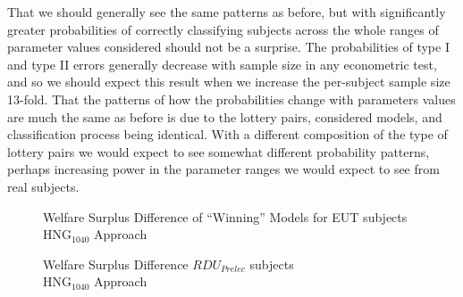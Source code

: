 \documentclass[../main.tex]{subfiles}
\begin{document}
That we should generally see the same patterns as before, but with significantly greater probabilities of correctly classifying subjects across the whole ranges of parameter values considered should not be a surprise.
The probabilities of type I and type II errors generally decrease with sample size in any econometric test, and so we should expect this result when we increase the per-subject sample size 13-fold.
That the patterns of how the probabilities change with parameters values are much the same as before is due to the lottery pairs, considered models, and classification process being identical.
With a different composition of the type of lottery pairs we would expect to see somewhat different probability patterns, perhaps increasing power in the parameter ranges we would expect to see from real subjects.

\begin{figure}[h!]
	\center
	\caption{Welfare Surplus Difference of \enquote{Winning} Models for EUT subjects\\$\text{HNG}_{1040}$ Approach}
	\label{fig:HNG_wel_eut}
\end{figure}

\begin{figure}[h!]
	\center
	\caption{Welfare Surplus Difference $\mathit{RDU_{Prelec}}$ subjects\\$\text{HNG}_{1040}$ Approach}
	\label{fig:HNG_wel_pre}
\end{figure}
\end{document}
